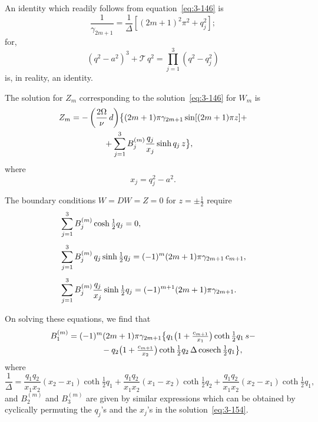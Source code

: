 An identity which readily follows from equation~\eqref{eq:3-146} is
\begin{equation}\label{eq:3-149}
\frac{1}{\gamma_{2m+1}} = \frac{1}{\Delta}[(2m+1)^2\pi^2 + q_j^2];
\end{equation}
for,
\begin{equation}\label{eq:3-150}
(q^2 - a^2)^3 + \mathscr{T}\,q^2 = \prod_{j=1}^{3}(q^2 - q_j^2)
\end{equation}
is, in reality, an identity.

The solution for $Z_m$ corresponding to the solution~\eqref{eq:3-146} for $W_m$ is
\begin{align}
Z_m &= -\left(\frac{2\Omega}{\nu}\,d\right)\!\bigl\{(2m+1)\pi\gamma_{2m+1}\sin[(2m+1)\pi z] + \notag\\
&\qquad\qquad + \sum_{j=1}^{3} B_j^{(m)}\frac{q_j}{x_j}\sinh q_j\, z\bigr\}, \label{eq:3-151}
\end{align}
where
\begin{equation}\label{eq:3-152}
x_j = q_j^2 - a^2.
\end{equation}

The boundary conditions $W = DW = Z = 0$ for $z = \pm\frac{1}{2}$ require
\begin{align}
&\sum_{j=1}^{3} B_j^{(m)}\cosh\tfrac{1}{2}q_j = 0, \notag\\[4pt]
&\sum_{j=1}^{3} B_j^{(m)}\,q_j\sinh\tfrac{1}{2}q_j = (-1)^m(2m+1)\pi\gamma_{2m+1}\, c_{m+1}, \label{eq:3-153}\\[4pt]
&\sum_{j=1}^{3} B_j^{(m)}\frac{q_j}{x_j}\sinh\tfrac{1}{2}q_j = (-1)^{m+1}(2m+1)\pi\gamma_{2m+1}. \notag
\end{align}

On solving these equations, we find that
\begin{align}
B_1^{(m)} &= (-1)^m(2m+1)\pi\gamma_{2m+1}\bigl\{q_1\bigl(1+\tfrac{c_{m+1}}{x_1}\bigr)\coth\tfrac{1}{2}q_1\, s - \notag\\
&\qquad\qquad -q_2\bigl(1+\tfrac{c_{m+1}}{x_2}\bigr)\coth\tfrac{1}{2}q_2\,\Delta\operatorname{cosech}\tfrac{1}{2}q_1\bigr\}, \label{eq:3-154}
\end{align}
where
\begin{equation}\label{eq:3-155}
\frac{1}{\Delta} = \frac{q_1 q_2}{x_1 x_2}(x_2 - x_1)\coth\tfrac{1}{2}q_1 + \frac{q_1 q_2}{x_1 x_2}(x_1 - x_2)\coth\tfrac{1}{2}q_2 + \frac{q_1 q_2}{x_1 x_2}(x_2 - x_1)\coth\tfrac{1}{2}q_1,
\end{equation}
and $B_2^{(m)}$ and $B_3^{(m)}$ are given by similar expressions which can be obtained by cyclically permuting the $q_j$'s and the $x_j$'s in the solution~\eqref{eq:3-154}.

